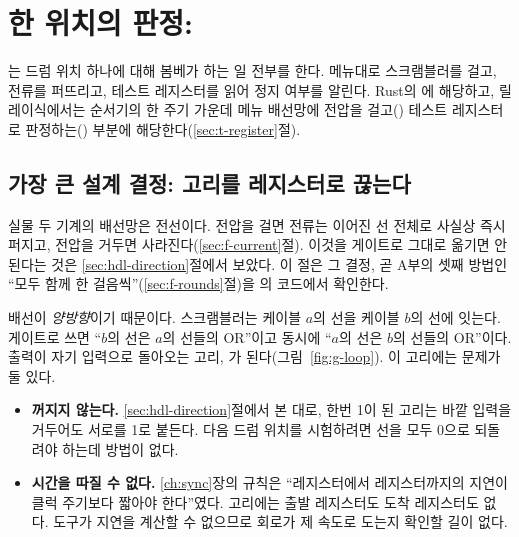 \chapter{한 위치의 판정: \texorpdfstring{}{bombe\_core}}\label{ch:rtl-core}

는 드럼 위치 하나에 대해 봄베가 하는 일 전부를 한다. 메뉴대로 스크램블러를 걸고, 전류를
퍼뜨리고, 테스트 레지스터를 읽어 정지 여부를 알린다. Rust의 에 해당하고, 릴레이식에서는 순서기의
한 주기 가운데 메뉴 배선망에 전압을 걸고() 테스트 레지스터로 판정하는() 부분에
해당한다(\ref{sec:t-register}절).

\section{가장 큰 설계 결정: 고리를 레지스터로 끊는다}

실물 두 기계의 배선망은 전선이다. 전압을 걸면 전류는 이어진 선 전체로 사실상 즉시 퍼지고, 전압을 거두면
사라진다(\ref{sec:f-current}절). 이것을 게이트로 그대로 옮기면 안 된다는 것은 \ref{sec:hdl-direction}절에서
보았다. 이 절은 그 결정, 곧 A부의 셋째 방법인 ``모두 함께 한 걸음씩''(\ref{sec:f-rounds}절)을 의
코드에서 확인한다.

\Why 배선이 \emph{양방향}이기 때문이다. 스크램블러는 케이블 $a$의 선을 케이블 $b$의 선에 잇는다. 게이트로 쓰면
``$b$의 선은 $a$의 선들의 OR''이고 동시에 ``$a$의 선은 $b$의 선들의 OR''이다. 출력이 자기 입력으로 돌아오는
고리, 가 된다(그림~\ref{fig:g-loop}). 이 고리에는 문제가 둘 있다.

\begin{itemize}
\item \textbf{꺼지지 않는다.} \ref{sec:hdl-direction}절에서 본 대로, 한번 1이 된 고리는 바깥 입력을 거두어도
서로를 1로 붙든다. 다음 드럼 위치를 시험하려면 선을 모두 0으로 되돌려야 하는데 방법이 없다.
\item \textbf{시간을 따질 수 없다.} \ref{ch:sync}장의 규칙은 ``레지스터에서 레지스터까지의 지연이 클럭
주기보다 짧아야 한다''였다. 고리에는 출발 레지스터도 도착 레지스터도 없다. 도구가 지연을 계산할 수 없으므로
회로가 제 속도로 도는지 확인할 길이 없다.
\end{itemize}

